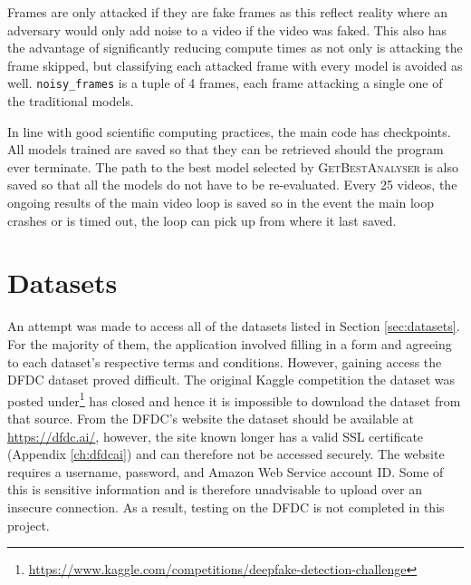 Frames are only attacked if they are fake frames as this reflect reality where an adversary would only add noise to a video if the video was faked. This also has the advantage of significantly reducing compute times as not only is attacking the frame skipped, but classifying each attacked frame with every model is avoided as well. \verb|noisy_frames| is a tuple of 4 frames, each frame attacking a single one of the traditional models. 

In line with good scientific computing practices, the main code has checkpoints. All models trained are saved so that they can be retrieved should the program ever terminate. The path to the best model selected by \textsc{GetBestAnalyser} is also saved so that all the models do not have to be re-evaluated. Every 25 videos, the ongoing results of the main video loop is saved so in the event the main loop crashes or is timed out, the loop can pick up from where it last saved. 

\section{Datasets}

An attempt was made to access all of the datasets listed in Section \ref{sec:datasets}. For the majority of them, the application involved filling in a form and agreeing to each dataset's respective terms and conditions. However, gaining access the DFDC dataset\cite{dolhansky2020deepfake} proved difficult. The original Kaggle competition the dataset was posted under\footnote{\url{https://www.kaggle.com/competitions/deepfake-detection-challenge}} has closed and hence it is impossible to download the dataset from that source. From the DFDC's website the dataset should be available at \url{https://dfdc.ai/}, however, the site known longer has a valid SSL certificate (Appendix \ref{ch:dfdcai}) and can therefore not be accessed securely. The website requires a username, password, and Amazon Web Service account ID. Some of this is sensitive information and is therefore unadvisable to upload over an insecure connection. As a result, testing on the DFDC is not completed in this project.